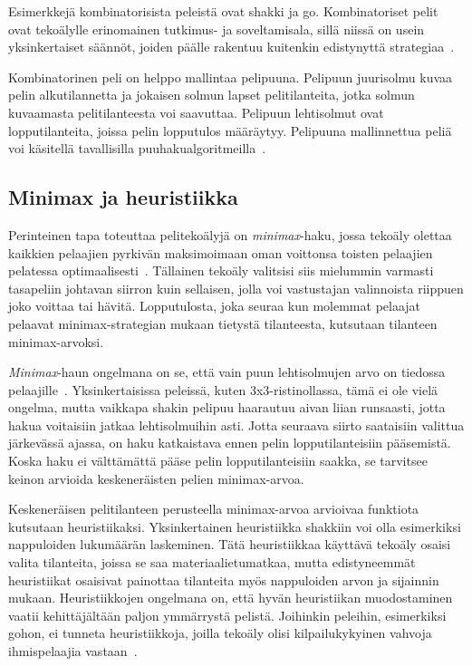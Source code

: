 \documentclass[12pt,finnish]{tktltiki2}
\theoremstyle{definition}
\theoremstyle{remark}
\begin{document}
Esimerkkejä kombinatorisista peleistä ovat shakki ja go. Kombinatoriset pelit ovat tekoälylle erinomainen tutkimus- ja soveltamisala, sillä niissä on usein yksinkertaiset säännöt, joiden päälle rakentuu kuitenkin edistynyttä strategiaa~\cite{browne}.

Kombinatorinen peli on helppo mallintaa pelipuuna. Pelipuun juurisolmu kuvaa pelin alkutilannetta ja jokaisen solmun lapset pelitilanteita, jotka solmun kuvaamasta pelitilanteesta voi saavuttaa. Pelipuun lehtisolmut ovat lopputilanteita, joissa pelin lopputulos määräytyy. Pelipuuna mallinnettua peliä voi käsitellä tavallisilla puuhakualgoritmeilla~\cite{aima}.

\subsection{Minimax ja heuristiikka}

Perinteinen tapa toteuttaa pelitekoälyjä on \textit{minimax}-haku, jossa tekoäly olettaa kaikkien pelaajien pyrkivän maksimoimaan oman voittonsa toisten pelaajien pelatessa optimaalisesti~\cite{aima}. Tällainen tekoäly valitsisi siis mielummin varmasti tasapeliin johtavan siirron kuin sellaisen, jolla voi vastustajan valinnoista riippuen joko voittaa tai hävitä. Lopputulosta, joka seuraa kun molemmat pelaajat pelaavat minimax-strategian mukaan tietystä tilanteesta, kutsutaan tilanteen minimax-arvoksi.

\textit{Minimax}-haun ongelmana on se, että vain puun lehtisolmujen arvo on tiedossa pelaajille~\cite{aima}. Yksinkertaisissa peleissä, kuten 3x3-ristinollassa, tämä ei ole vielä ongelma, mutta vaikkapa shakin pelipuu haarautuu aivan liian runsaasti, jotta hakua voitaisiin jatkaa lehtisolmuihin asti. Jotta seuraava siirto saataisiin valittua järkevässä ajassa, on haku katkaistava ennen pelin lopputilanteisiin pääsemistä. Koska haku ei välttämättä pääse pelin lopputilanteisiin saakka, se tarvitsee keinon arvioida keskeneräisten pelien minimax-arvoa.

Keskeneräisen pelitilanteen perusteella minimax-arvoa arvioivaa funktiota kutsutaan heuristiikaksi. Yksinkertainen heuristiikka shakkiin voi olla esimerkiksi nappuloiden lukumäärän laskeminen. Tätä heuristiikkaa käyttävä tekoäly osaisi valita tilanteita, joissa se saa materiaalietumatkaa, mutta edistyneemmät heuristiikat osaisivat painottaa tilanteita myös nappuloiden arvon ja sijainnin mukaan. Heuristiikkojen ongelmana on, että hyvän heuristiikan muodostaminen vaatii kehittäjältään paljon ymmärrystä pelistä. Joihinkin peleihin, esimerkiksi gohon, ei tunneta heuristiikkoja, joilla tekoäly olisi kilpailukykyinen vahvoja ihmispelaajia vastaan~\cite{browne}.
\end{document}
